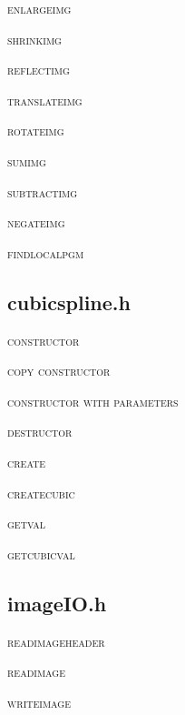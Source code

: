\documentclass[pdftex, 11pt]{article}
\begin{document}
\begin{description}
	\item{\textsc{enlargeimg}}


	\item{\textsc{shrinkimg}}


	\item{\textsc{reflectimg}}


	\item{\textsc{translateimg}}


	\item{\textsc{rotateimg}}


	\item{\textsc{sumimg}}


	\item{\textsc{subtractimg}}


	\item{\textsc{negateimg}}


	\item{\textsc{findlocalpgm}}

\end{description}

\subsection{cubicspline.h}

\begin{description}
	\item{\textsc{constructor}}

	\item{\textsc{copy constructor}}

	\item{\textsc{constructor with parameters}}

	\item{\textsc{destructor}}

	\item{\textsc{create}}

	\item{\textsc{createcubic}}

	\item{\textsc{getval}}

	\item{\textsc{getcubicval}}

\end{description}

\subsection{imageIO.h}

\begin{description}
	\item{\textsc{readimageheader}}

	\item{\textsc{readimage}}

	\item{\textsc{writeimage}}

\end{description}
\end{document}
